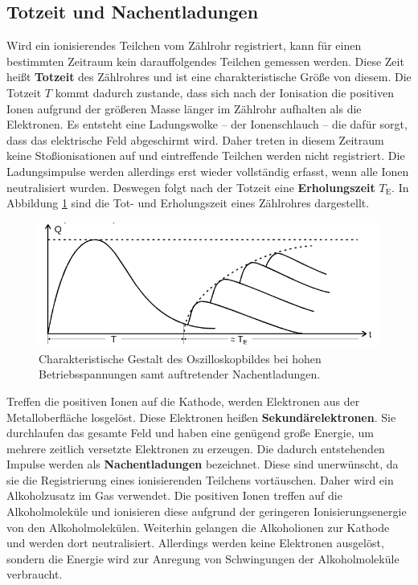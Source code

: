 \subsection{Totzeit und Nachentladungen}
Wird ein ionisierendes Teilchen vom Zählrohr registriert, kann für einen bestimmten Zeitraum
kein darauffolgendes Teilchen gemessen werden.
Diese Zeit heißt \textbf{Totzeit} des Zählrohres und ist eine charakteristische Größe von diesem.
Die Totzeit $T$ kommt dadurch zustande, dass sich nach der Ionisation die positiven Ionen
aufgrund der größeren Masse länger im Zählrohr aufhalten als die Elektronen.
Es entsteht eine Ladungswolke -- der Ionenschlauch -- die dafür sorgt, dass das elektrische Feld
abgeschirmt wird. Daher treten in diesem Zeitraum keine Stoßionisationen auf und eintreffende
Teilchen werden nicht registriert.
Die Ladungsimpulse werden allerdings erst wieder vollständig erfasst, wenn alle Ionen neutralisiert
wurden. Deswegen folgt nach der Totzeit eine \textbf{Erholungszeit} $T_{\mathrm{E}}$.
In Abbildung \ref{fig:nachladen} sind die Tot- und Erholungszeit eines Zählrohres dargestellt.
\begin{figure}
  \centering
  \includegraphics[width=\textwidth]{Bilder/erholzeit.png}
  \caption{Charakteristische Gestalt des Oszilloskopbildes bei hohen Betriebsspannungen samt auftretender Nachentladungen. \cite{Anleitung}}
  \label{fig:nachladen}
\end{figure}

Treffen die positiven Ionen auf die Kathode, werden Elektronen aus der Metalloberfläche
losgelöst. Diese Elektronen heißen \textbf{Sekundärelektronen}. Sie durchlaufen das gesamte
Feld und haben eine genügend große Energie, um mehrere zeitlich versetzte Elektronen
zu erzeugen. Die dadurch entstehenden Impulse werden als \textbf{Nachentladungen} bezeichnet.
Diese sind unerwünscht, da sie die Registrierung eines ionisierenden Teilchens vortäuschen.
Daher wird ein Alkoholzusatz im Gas verwendet. Die positiven Ionen treffen auf die
Alkoholmoleküle und ionisieren diese aufgrund der geringeren Ionisierungsenergie von den
Alkoholmolekülen. Weiterhin gelangen die Alkoholionen zur Kathode und werden dort neutralisiert.
Allerdings werden keine Elektronen ausgelöst, sondern die Energie wird zur Anregung von
Schwingungen der Alkoholmoleküle verbraucht.
\FloatBarrier
